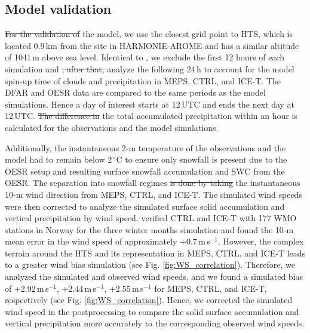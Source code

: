 \documentclass{ametsocV5}
\providecommand{\DIFadd}[1]{{\protect\color{blue}\uwave{#1}}} %
\providecommand{\DIFdel}[1]{{\protect\color{red}\sout{#1}}}                      %
\providecommand{\DIFaddbegin}{} %
\providecommand{\DIFaddend}{} %
\providecommand{\DIFdelbegin}{} %
\providecommand{\DIFdelend}{} %
\newcommand{\DIFscaledelfig}{0.5}
\newlength{\DIFdelgraphicswidth} %
\newlength{\DIFdelgraphicsheight} %
\newcommand{\DIFaddincludegraphics}[2][]{{\color{blue}\fbox{\DIFOincludegraphics[#1]{#2}}}} %
\newcommand{\DIFdelincludegraphics}[2][]{%
\sbox{\DIFdelgraphicsbox}{\DIFOincludegraphics[#1]{#2}}%
\settoboxwidth{\DIFdelgraphicswidth}{\DIFdelgraphicsbox} %
\settoboxtotalheight{\DIFdelgraphicsheight}{\DIFdelgraphicsbox} %
\scalebox{\DIFscaledelfig}{%
\parbox[b]{\DIFdelgraphicswidth}{\usebox{\DIFdelgraphicsbox}\\[-\baselineskip] \rule{\DIFdelgraphicswidth}{0em}}\llap{\resizebox{\DIFdelgraphicswidth}{\DIFdelgraphicsheight}{%
\setlength{\unitlength}{\DIFdelgraphicswidth}%
\begin{picture}(1,1)%
\thicklines\linethickness{2pt} %
{\color[rgb]{1,0,0}\put(0,0){\framebox(1,1){}}}%
{\color[rgb]{1,0,0}\put(0,0){\line( 1,1){1}}}%
{\color[rgb]{1,0,0}\put(0,1){\line(1,-1){1}}}%
\end{picture}%
}\hspace*{3pt}}} %
} %
\DeclareRobustCommand{\DIFaddbegin}{\DIFOaddbegin \let\includegraphics\DIFaddincludegraphics} %
\DeclareRobustCommand{\DIFaddend}{\DIFOaddend \let\includegraphics\DIFOincludegraphics} %
\DeclareRobustCommand{\DIFdelbegin}{\DIFOdelbegin \let\includegraphics\DIFdelincludegraphics} %
\DeclareRobustCommand{\DIFdelend}{\DIFOaddend \let\includegraphics\DIFOincludegraphics} %
\begin{document}
		
		
	\subsection{Model validation}\label{sec:methodology:MEPS_vali}
		\DIFdelbegin \DIFdel{For the validation of }\DIFdelend \DIFaddbegin \DIFadd{To validate }\DIFaddend the model, we use the closest grid point to HTS, which is located 0.9\,km from the site in HARMONIE-AROME and has a similar altitude of 1041\,m above sea level. Identical to \citet{engdahl_effects_2020}, we exclude the first 12 hours of each simulation and \DIFdelbegin \DIFdel{, after that, }\DIFdelend \DIFaddbegin \DIFadd{then }\DIFaddend analyze the following 24\,h to account for the model spin-up time of clouds and precipitation in MEPS, CTRL, and ICE-T. The DFAR and OESR data are compared to the same periods as the model simulations. Hence a day of interest starts at 12\,UTC and ends the next day at 12\,UTC. \DIFdelbegin \DIFdel{The difference in }\DIFdelend \DIFaddbegin \DIFadd{Finally, }\DIFaddend the total accumulated precipitation \DIFaddbegin \DIFadd{difference }\DIFaddend within an hour is calculated for the observations and the model simulations. 

		Additionally, the instantaneous 2-m temperature of the observations and the model had to remain below 2\,$^{\circ}$C to ensure only snowfall is present due to the OESR setup and resulting surface snowfall accumulation and SWC from the OESR. The separation into snowfall regimes \DIFdelbegin \DIFdel{is done by taking }\DIFdelend \DIFaddbegin \DIFadd{takes }\DIFaddend the instantaneous 10-m wind direction from MEPS, CTRL, and ICE-T. The simulated wind speeds were then corrected to analyze the simulated surface solid accumulation and vertical precipitation by wind speed. \citet{engdahl_effects_2020} verified CTRL and ICE-T with 177 WMO stations in Norway for the three winter months simulation and found the 10-m mean error in the wind speed of approximately +0.7\,m\,s$^{-1}$. However, the complex terrain around the HTS and its representation in MEPS, CTRL, and ICE-T leads to a greater wind bias simulation (see Fig. \ref{fig:WS_correlation}). Therefore, we analyzed the simulated and observed wind speeds, and we found a simulated bias of +2.92\,m\,s$^{-1}$, +2.44\,m\,s$^{-1}$, +2.55\,m\,s$^{-1}$ for MEPS, CTRL, and ICE-T, respectively (see Fig. \ref{fig:WS_correlation}). Hence, we corrected the simulated wind speed in the postprocessing to compare the solid surface accumulation and vertical precipitation more accurately to the corresponding observed wind speeds. 
\end{document}
